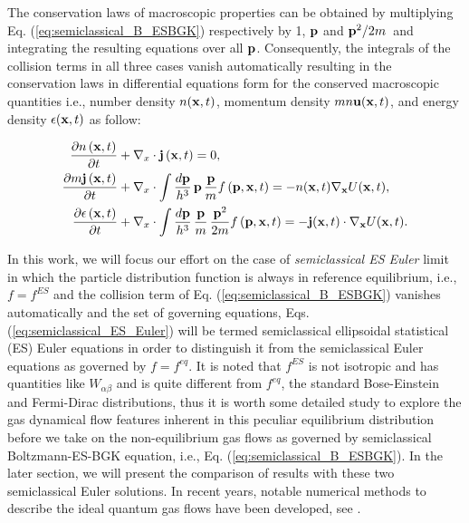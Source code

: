 \documentclass{rsproca}%
\begin{document}
The conservation laws of macroscopic properties can be obtained by multiplying Eq. (\ref{eq:semiclassical_B_ESBGK}) respectively by 1, ${\bf p}$ and \({\bf p}^2/2m\)\, and integrating the resulting equations over all ${\bf p}$.  Consequently, the integrals of the collision terms in all three cases vanish automatically resulting in the conservation laws in differential equations form for the conserved macroscopic quantities i.e., number density \(n({\bf x},t)\), momentum density \(m n {\bf u}({\bf x},t)\), and energy density \(\epsilon({\bf x},t)\) as follow:

\begin{subequations}
\begin{align}
\frac{\partial n\left({\bf x},t\right)}{\partial t}&+{\bf \nabla }_x\cdot{\bf j}\left({\bf x},t\right)=0, \\
\frac{\partial m\/{\bf j}\left({\bf x},t\right)}{\partial t}&+{\bf \nabla }_x\cdot\int{\frac{d{\bf p}}{h^3}}\,{\bf p}\,\frac{\bf p}{m}f\left({\bf p},{\bf x},t\right)= -n({\bf x},t){\bf \nabla}_{\bf x}U({\bf x},t), \\
\frac{\partial \epsilon \left({\bf x},t\right)}{\partial t}&+{\bf \nabla }_x\cdot\int{\frac{d\bf p}{h^3}}\,\frac{\bf p}{m}\,\frac{{\bf p}^2}{2m}f\left({\bf p},{\bf x},t\right)=-{\bf j}({\bf x},t)\cdot{\bf \nabla}_{\bf x}U({\bf x},t).
\end{align}
\label{eq:semiclassical_ES_Euler}
\end{subequations}

In this work, we will focus our effort on the case of {\em semiclassical ES Euler} limit in which the particle distribution function is always in reference equilibrium, i.e., $f=f^{ES}$ and the collision term of Eq. (\ref{eq:semiclassical_B_ESBGK}) vanishes automatically and the set of governing equations, Eqs. (\ref{eq:semiclassical_ES_Euler}) will be termed semiclassical ellipsoidal statistical (ES) Euler equations in order to distinguish it from the semiclassical Euler equations as governed by $f=f^{eq}$.  It is noted that $f^{ES}$ is not isotropic and has quantities like $W_{\alpha \beta}$ and is quite different from $f^{eq}$, the standard Bose-Einstein and Fermi-Dirac distributions, thus it is worth some detailed study to explore the gas dynamical flow features inherent in this peculiar equilibrium distribution before we take on the non-equilibrium gas flows as governed by semiclassical Boltzmann-ES-BGK equation, i.e., Eq. (\ref{eq:semiclassical_B_ESBGK}). In the later section, we will present the comparison of results with these two semiclassical Euler solutions.  In recent years, notable numerical methods to describe the ideal quantum gas flows have been developed, see \cite{1272832,Shi20089389,Jaw-YenYang05082006}.
\end{document}
